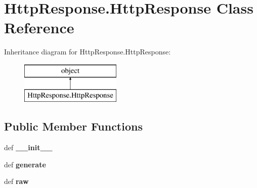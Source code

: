 \hypertarget{class_http_response_1_1_http_response}{\section{Http\-Response.\-Http\-Response Class Reference}
\label{class_http_response_1_1_http_response}
}
Inheritance diagram for Http\-Response.\-Http\-Response\-:\begin{figure}[H]
\begin{center}
\leavevmode
\includegraphics[height=2.000000cm]{class_http_response_1_1_http_response}
\end{center}
\end{figure}
\subsection*{Public Member Functions}
\begin{DoxyCompactItemize}
\item 
\hypertarget{class_http_response_1_1_http_response_a70270df83b9b93669fb29bb06d6b39dc}{def {\bfseries \-\_\-\-\_\-init\-\_\-\-\_\-}}\label{class_http_response_1_1_http_response_a70270df83b9b93669fb29bb06d6b39dc}

\item 
\hypertarget{class_http_response_1_1_http_response_a100e9b3df1551b7934d83c24ea7c5d0f}{def {\bfseries generate}}\label{class_http_response_1_1_http_response_a100e9b3df1551b7934d83c24ea7c5d0f}

\item 
\hypertarget{class_http_response_1_1_http_response_a340c587e2e3e509d57b2e2adb51aeebf}{def {\bfseries raw}}\label{class_http_response_1_1_http_response_a340c587e2e3e509d57b2e2adb51aeebf}

\end{DoxyCompactItemize}
